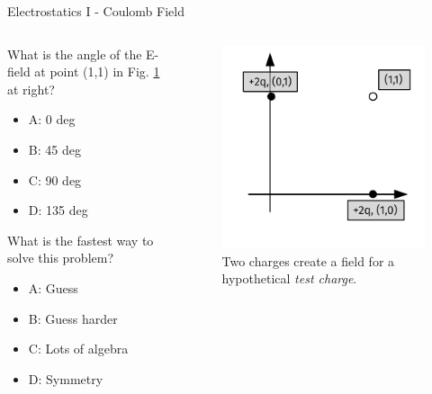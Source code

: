 \documentclass{beamer}
\begin{document}
\begin{frame}{Electrostatics I - Coulomb Field}
\small
\begin{columns}[T]
\begin{column}{0.5\textwidth}
What is the angle of the E-field at point (1,1) in Fig. \ref{fig:netfield2} at right?
\begin{itemize}
\item A: 0 deg
\item B: 45 deg
\item C: 90 deg
\item D: 135 deg
\end{itemize}
What is the fastest way to solve this problem?
\begin{itemize}
\item A: Guess
\item B: Guess harder
\item C: Lots of algebra
\item D: Symmetry
\end{itemize}
\end{column}
\begin{column}{0.5\textwidth}
\begin{figure}
\includegraphics[width=\textwidth]{figures/NetField2.pdf}
\caption{\label{fig:netfield2} Two charges create a field for a hypothetical \textit{test charge}.}
\end{figure}
\end{column}
\end{columns}
\end{frame}
\end{document}
